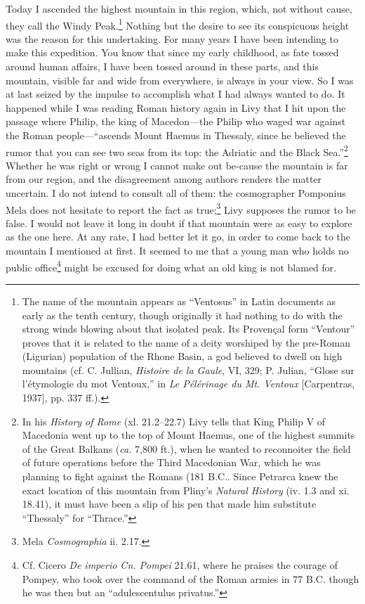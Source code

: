\noindent Today I ascended the highest mountain in this region, which,
not without cause, they call the Windy Peak.\footnote{The name of the
mountain appears as ``Ventosus'' in Latin documents as early as the
tenth century, though originally it had nothing to do with the strong
winds blowing about that isolated peak. Its Proven\c{c}al form
``Ventour'' proves that it is related to the name of a deity worshiped
by the pre-Roman (Ligurian) population of the Rhone Basin, a god
believed to dwell on high mountains (cf. C. Jullian, \textit{Histoire
de la Gaule}, VI, 329; P. Julian, ``Glose sur l'\'{e}tymologie du mot
Ventoux,'' in \textit{Le P\'{e}l\'{e}rinage du Mt. Ventoux}
[Carpentras, 1937], pp. 337 ff.).} Nothing but the desire to see its
conspicuous height was the reason for this undertaking. For many years
I have been intending to make this expedition. You know that since my
early childhood, as fate tossed around human affairs, I have been
tossed around in these parts, and this mountain, visible far and wide
from everywhere, is always in your view. So I was at last seized by
the impulse to accomplish what I had always wanted to do. It happened
while I was reading Roman history again in Livy that I hit upon the
passage where Philip, the king of Macedon---the Philip who waged war
against the Roman people---``ascends Mount Haemus in Thessaly, since
he believed the rumor that you can see two seas from its top: the
Adriatic and the Black Sea.''\footnote{In his \textit{History of Rome}
(xl. 21.2--22.7) Livy tells that King Philip V of Macedonia went up to
the top of Mount Haemus, one of the highest summits of the Great
Balkans (\textit{ca.} 7,800 ft.), when he wanted to reconnoiter the
field of future operations before the Third Macedonian War, which he
was planning to fight against the Romans (181 \textsc{B.C.}. Since
Petrarca knew the exact location of this mountain from Pliny's
\textit{Natural History} (iv. 1.3 and xi. 18.41), it must have been a
slip of his pen that made him substitute ``Thessaly'' for ``Thrace.''}
Whether he was right or wrong I cannot make out be-cause the
mountain is far from our region, and the disagreement among authors
renders the matter uncertain. I do not intend to consult all of them:
the cosmographer Pomponius Mela does not hesitate to report the fact
as true;\footnote{Mela \textit{Cosmographia} ii. 2.17.} Livy supposes
the rumor to be false. I would not leave it long in doubt if that
mountain were as easy to explore as the one here. At any rate, I had
better let it go, in order to come back to the mountain I mentioned at
first. It seemed to me that a young man who holds no public
office\footnote{Cf. Cicero \textit{De imperio Cn. Pompei} 21.61, where
he praises the courage of Pompey, who took over the command of the
Roman armies in 77 \textsc{B.C.} though he was then but an
``adulescentulus privatus.''} might be excused for doing what an old
king is not blamed for.

